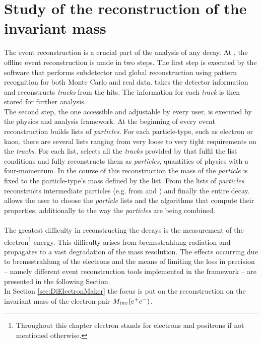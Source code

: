 \chapter{Study of the reconstruction of the \BdKstee invariant mass}
\label{chapter3}
The event reconstruction is a crucial part of the analysis of any decay. At \lhcb, the offline event reconstruction is made in two steps. The first step is executed by the software \brunel that performs subdetector and global reconstruction using pattern recognition for both Monte Carlo and real data. \brunel takes the detector information and reconstructs \textit{tracks} from the hits. The information for each \textit{track} is then stored for further analysis.\\
The second step, the one accessible and adjustable by every user, is executed by the \davinci physics and analysis framework. At the beginning of every event reconstruction \davinci builds lists of \textit{particles}. For each particle-type, such as electron or kaon, there are several lists ranging from very loose to very tight requirements on the \textit{tracks}. For each list, \davinci selects all the \textit{tracks} provided by \brunel that fulfil the list conditions and fully reconstructs them as \textit{particles}, quantities of physics with a four-momentum. In the course of this reconstruction the mass of the \textit{particle} is fixed to the particle-type's mass defined by the list.
From the lists of \textit{particles} \davinci reconstructs intermediate particles (e.g. \Kstarz from \Kp and \pim) and finally the entire \BdKstee decay. \davinci allows the user to choose the \textit{particle} lists and the algorithms that compute their properties, additionally to the way the \textit{particles} are being combined.\\ %
\\
The greatest difficulty in reconstructing the \BdKstee decays is the measurement of the electron\footnote{Throughout this chapter electron stands for electrons and positrons if not mentioned otherwise.} energy. This difficulty arises from bremsstrahlung radiation and propagates to a vast degradation of the \Bd mass resolution. The effects occurring due to bremsstrahlung of the electrons and the means of limiting the loss in precision -- namely different event reconstruction tools implemented in the \davinci framework -- are presented in the following Section. \\
In Section \ref{sec:DiElectronMaker} the focus is put on the reconstruction on the invariant mass of the electron pair $M_{inv}(e^+e^-)$.\\
\newpage
